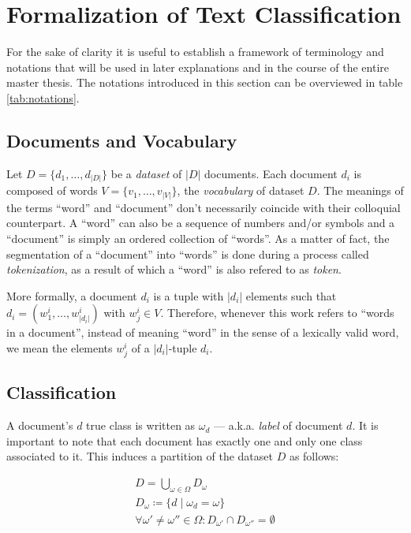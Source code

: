 \section{Formalization of Text Classification}
 
 \label{sec:formalization}
For the sake of clarity it is useful to establish a framework of terminology and
notations that will be used in later explanations and in the course of 
the entire master thesis. The notations introduced in this section can be
overviewed in table \ref{tab:notations}.



\subsection{Documents and Vocabulary}

Let $D=\{d_1, \ldots, d_{|D|}\}$ be a \textit{dataset} of $|D|$
documents. Each document $d_i$ is composed of words $V = \{v_1, \ldots,
v_{|V|}\}$, the \textit{vocabulary} of dataset $D$.
The meanings of the terms ``word'' and ``document'' don't necessarily coincide
with their colloquial counterpart. A ``word'' can also be a sequence of numbers
and/or symbols and a ``document'' is simply an ordered collection of ``words''.
As a matter of fact, the segmentation of a ``document'' into ``words'' is done
during a process called \emph{tokenization}, as a result of which a
``word'' is also refered to as \emph{token}.

More formally, a document $d_i$ is a tuple with $|d_i|$ elements such that
$d_i = (w_1^i,\ldots,w_{|d_i|}^i)$ with $w_j^i \in V$.
Therefore, whenever this work refers to ``words in a document'', instead of
meaning ``word'' in the sense of a lexically valid word, we mean the elements
$w_j^i$ of a $|d_i|$-tuple $d_i$.

\subsection{Classification}

A document's $d$ true class is written as $\omega_{d}$ ---  a.k.a.
\emph{label} of document $d$. It is important to note that each document has exactly one and
only one class associated to it. This induces a partition of the dataset $D$ as follows:

\begin{eqnarray*}
 D = \bigcup\limits_{\omega \in \Omega} D_\omega \\
 D_\omega \coloneqq  \{ d \mid \omega_d = \omega\} \\
\forall \omega' \neq \omega'' \in \Omega: D_{\omega'} \cap D_{\omega''} =
 \emptyset 
\end{eqnarray*}

